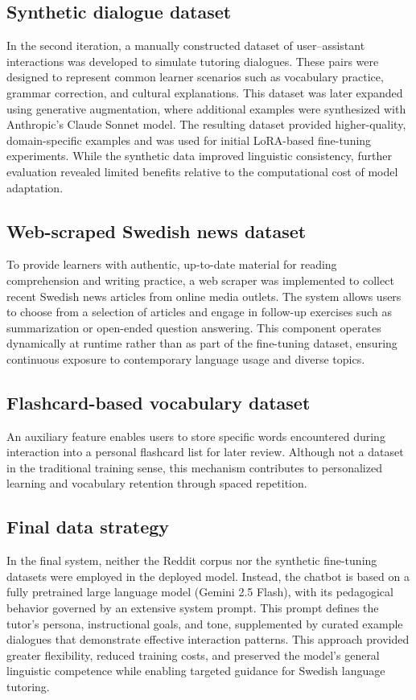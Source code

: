 \documentclass[a4paper,10pt]{article}
\begin{document}
\subsection{Synthetic dialogue dataset}
In the second iteration, a manually constructed dataset of user–assistant interactions was developed to simulate tutoring dialogues. These pairs were designed to represent common learner scenarios such as vocabulary practice, grammar correction, and cultural explanations. This dataset was later expanded using generative augmentation, where additional examples were synthesized with Anthropic’s Claude Sonnet model. The resulting dataset provided higher-quality, domain-specific examples and was used for initial LoRA-based fine-tuning experiments. While the synthetic data improved linguistic consistency, further evaluation revealed limited benefits relative to the computational cost of model adaptation.

\subsection{Web-scraped Swedish news dataset}
To provide learners with authentic, up-to-date material for reading comprehension and writing practice, a web scraper was implemented to collect recent Swedish news articles from online media outlets. The system allows users to choose from a selection of articles and engage in follow-up exercises such as summarization or open-ended question answering. This component operates dynamically at runtime rather than as part of the fine-tuning dataset, ensuring continuous exposure to contemporary language usage and diverse topics.

\subsection{Flashcard-based vocabulary dataset}
An auxiliary feature enables users to store specific words encountered during interaction into a personal flashcard list for later review. Although not a dataset in the traditional training sense, this mechanism contributes to personalized learning and vocabulary retention through spaced repetition.

\subsection{Final data strategy}
In the final system, neither the Reddit corpus nor the synthetic fine-tuning datasets were employed in the deployed model. Instead, the chatbot is based on a fully pretrained large language model (Gemini 2.5 Flash), with its pedagogical behavior governed by an extensive system prompt. This prompt defines the tutor’s persona, instructional goals, and tone, supplemented by curated example dialogues that demonstrate effective interaction patterns. This approach provided greater flexibility, reduced training costs, and preserved the model’s general linguistic competence while enabling targeted guidance for Swedish language tutoring.
\end{document}
